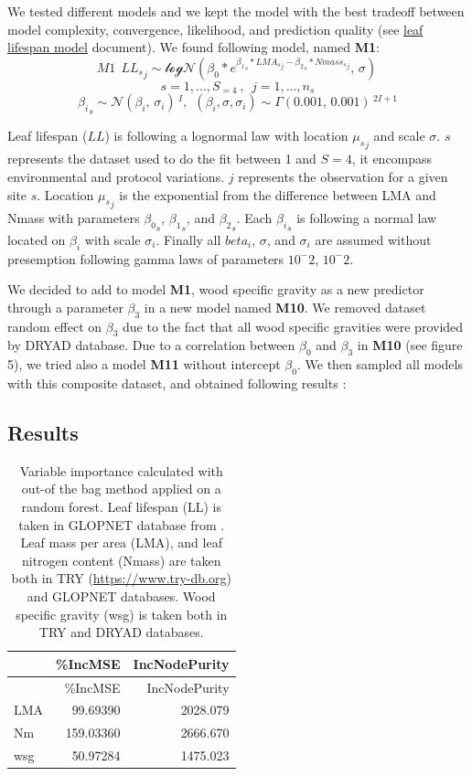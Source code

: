 \documentclass[12pt,]{article}
\theoremstyle{definition}
\theoremstyle{definition}
\theoremstyle{remark}
\begin{document}
We tested different models and we kept the model with the best tradeoff
between model complexity, convergence, likelihood, and prediction
quality (see \href{LL2.html}{leaf lifespan model} document). We found
following model, named \textbf{M1}:
\[M1~~ {LL_s}_j \sim \mathcal{logN}(\beta_0*e^{{\beta_1}_s*{LMA_s}_j - {\beta_2}_s*{Nmass_s}_j},\,\sigma)\,\]
\[s=1,...,S_{=4}~, ~~j=1,...,n_s\]
\[{\beta_i}_s \sim \mathcal{N}({\beta_i},\,\sigma_i)\,^I, ~~(\beta_i, \sigma, \sigma_i) \sim \mathcal{\Gamma}(0.001,\,0.001)\,^{2I+1}\]

Leaf lifespan (\(LL\)) is following a lognormal law with location
\({\mu_s}_j\) and scale \(\sigma\). \(s\) represents the dataset used to
do the fit between 1 and \(S=4\), it encompass environmental and
protocol variations. \(j\) represents the observation for a given site
\(s\). Location \({\mu_s}_j\) is the exponential from the difference
between LMA and Nmass with parameters \({\beta_0}_s\), \({\beta_1}_s\),
and \({\beta_2}_s\). Each \({\beta_i}_s\) is following a normal law
located on \(\beta_i\) with scale \(\sigma_i\). Finally all \(beta_i\),
\(\sigma\), and \(\sigma_i\) are assumed without presemption following
gamma laws of parameters \(10^-2\), \(10^-2\).

We decided to add to model \textbf{M1}, wood specific gravity as a new
predictor through a parameter \(\beta_3\) in a new model named
\textbf{M10}. We removed dataset random effect on \(\beta_3\) due to the
fact that all wood specific gravities were provided by DRYAD database.
Due to a correlation between \(\beta_0\) and \(\beta_3\) in \textbf{M10}
(see figure 5), we tried also a model \textbf{M11} without intercept
\(\beta_0\). We then sampled all models with this composite dataset, and
obtained following results :

\subsection{Results}\label{results-1}

\begin{longtable}[]{@{}lrr@{}}
\caption{\label{tab:OOB}Variable importance calculated with out-of the bag
method applied on a random forest. Leaf lifespan (LL) is taken in
GLOPNET database from \citet{wright_worldwide_2004}. Leaf mass per area
(LMA), and leaf nitrogen content (Nmass) are taken both in TRY
(\url{https://www.try-db.org}) and GLOPNET databases. Wood specific
gravity (wsg) is taken both in TRY and DRYAD databases.}\tabularnewline
\toprule
& \%IncMSE & IncNodePurity\tabularnewline
\midrule
\endfirsthead
\toprule
& \%IncMSE & IncNodePurity\tabularnewline
\midrule
\endhead
LMA & 99.69390 & 2028.079\tabularnewline
Nm & 159.03360 & 2666.670\tabularnewline
wsg & 50.97284 & 1475.023\tabularnewline
\bottomrule
\end{longtable}
\end{document}

